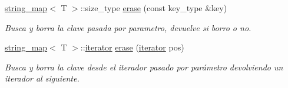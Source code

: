\begin{DoxyCompactItemize}
\hyperlink{classstring__map}{string\+\_\+map}$<$ T $>$\+::size\+\_\+type \hyperlink{classstring__map_a978744cf6b1e5bccda86fd58e8cf5875}{erase} (const key\+\_\+type \&key)
\begin{DoxyCompactList}\small\item\em Busca y borra la clave pasada por parametro, devuelve si borro o no. \end{DoxyCompactList}\item 
\hyperlink{classstring__map}{string\+\_\+map}$<$ T $>$\+::\hyperlink{classstring__map_1_1iterator}{iterator} \hyperlink{classstring__map_aad96e9f05f2a7f4196331e0fcba3bae7}{erase} (\hyperlink{classstring__map_1_1iterator}{iterator} pos)
\begin{DoxyCompactList}\small\item\em Busca y borra la clave desde el iterador pasado por parámetro devolviendo un iterador al siguiente. \end{DoxyCompactList}\end{DoxyCompactItemize}
